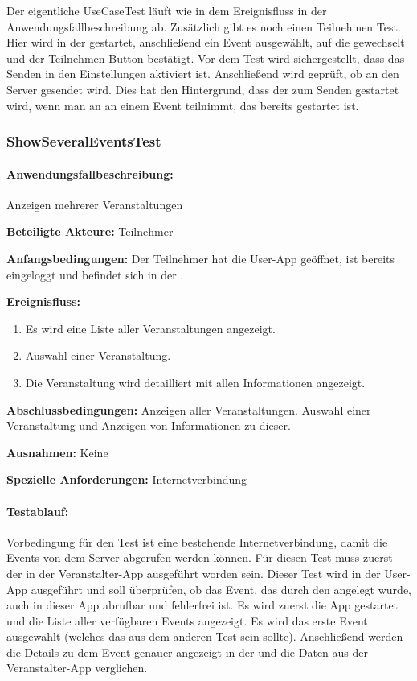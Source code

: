Der eigentliche UseCaseTest läuft wie in dem Ereignisfluss in der Anwendungsfallbeschreibung ab. Zusätzlich gibt es noch einen Teilnehmen  Test. Hier wird in der  gestartet, anschließend ein Event ausgewählt, auf die  gewechselt und der Teilnehmen-Button bestätigt. Vor dem Test wird sichergestellt, dass das Senden in den Einstellungen aktiviert ist. Anschließend wird geprüft, ob an den Server gesendet wird. Dies hat den Hintergrund, dass der  zum Senden gestartet wird, wenn man an an einem Event teilnimmt, das bereits gestartet ist.


\subsubsection{ShowSeveralEventsTest}
\paragraph{Anwendungsfallbeschreibung:} Anzeigen mehrerer Veranstaltungen

\textbf{Beteiligte Akteure:}
	Teilnehmer
	
\textbf{Anfangsbedingungen:}
	Der Teilnehmer hat die User-App geöffnet, ist bereits eingeloggt und befindet sich in der .
	
\textbf{Ereignisfluss:}
	\begin{enumerate}
		\item Es wird eine Liste aller Veranstaltungen angezeigt.
		\item Auswahl einer Veranstaltung.
		\item Die Veranstaltung wird detailliert mit allen Informationen angezeigt.
	\end{enumerate}
	
\textbf{Abschlussbedingungen:}
	Anzeigen aller Veranstaltungen. Auswahl einer Veranstaltung und Anzeigen von Informationen zu dieser.
	
\textbf{Ausnahmen:}
	Keine
	
\textbf{Spezielle Anforderungen:}
	Internetverbindung

\paragraph{Testablauf:}
Vorbedingung für den Test ist eine bestehende Internetverbindung, damit die Events von dem Server abgerufen werden können.
Für diesen Test muss zuerst der  in der Veranstalter-App ausgeführt worden sein. Dieser Test wird in der User-App ausgeführt und soll überprüfen, ob das Event, das durch den  angelegt wurde, auch in dieser App abrufbar und fehlerfrei ist.
Es wird zuerst die App gestartet und die Liste aller verfügbaren Events angezeigt. Es wird das erste Event ausgewählt (welches das aus dem anderen Test sein sollte). Anschließend werden die Details zu dem Event genauer angezeigt in der  und die Daten aus der Veranstalter-App verglichen.